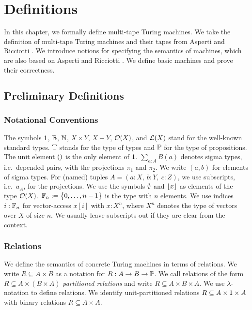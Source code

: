 \chapter{Definitions}
\label{chap:definitions}

In this chapter, we formally define multi-tape Turing machines.  We take the definition of multi-tape Turing machines and their tapes from Asperti and
Ricciotti \cite{asperti2015}.  We introduce notions for specifying the semantics of machines, which are also based on Asperti and Ricciotti
\cite{asperti2015}.  We define basic machines and prove their correctness.

\section{Preliminary Definitions}
\label{sec:prelim}


\subsection{Notational Conventions}
\label{sec:notational-conventions}

The symbols $\mathsf{1}$, $\mathbb{B}$, $\mathbb{N}$, $X \times Y$, $X + Y$, $\mathcal{O}(X)$, and $\mathcal{L}(X)$ stand for the well-known standard types.  $\mathbb{T}$ stands for
the type of types and $\mathbb{P}$ for the type of propositions.  The unit element $\mathsf{()}$ is the only element of $\mathsf{1}$.  $\sum_{a:A} B(a)$ denotes sigma
types, i.e.\ depended pairs, with the projections $\pi_1$ and $\pi_2$.  We write $(a,b)$ for elements of sigma types.  For (named) tuples
$A = (a:X,~b:Y,~c:Z)$, we use subscripts, i.e.\ $a_A$, for the projections.  We use the symbols $\emptyset$ and $\left\lfloor {x} \right\rfloor$ as elements of the type
$\mathcal{O}(X)$.  $\mathbb{F}_n := \bigl\{ 0, \dots, n-1 \bigr \}$ is the type with $n$ elements.  We use indices $i:\mathbb{F}_n$ for vector-access $x[i]$ with $x:X^n$,
where $X^n$ denotes the type of vectors over $X$ of size $n$.  We usually leave subscripts out if they are clear from the context.


\subsection{Relations}
\label{sec:relations}

We define the semantics of concrete Turing machines in terms of relations.  We write $R \subseteq A \times B$ as a notation for
$R : A \rightarrow B \rightarrow \mathbb{P}$.  We call relations of the form $R \subseteq A \times (B \times A)$ \emph{partitioned relations} and write
$R \subseteq A \times B \times A$.  We use $\lambda$-notation to define relations.  We identify unit-partitioned relations
$R \subseteq A \times \mathsf{1} \times A$ with binary relations $R \subseteq A \times A$.

